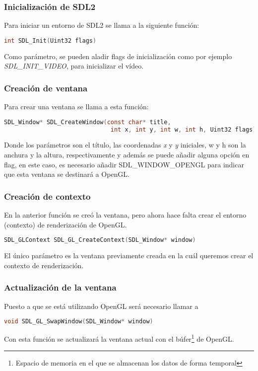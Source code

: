 \subsubsection{Inicialización de SDL2}
Para iniciar un entorno de SDL2 se llama a la siguiente función:
\begin{lstlisting}[language=C]
  int SDL_Init(Uint32 flags)
\end{lstlisting}
Como parámetro, se pueden aladir flags de inicialización como por ejemplo
\textit{SDL\_INIT\_VIDEO}, para inicializar el vídeo.

\subsubsection{Creación de ventana}
Para crear una ventana se llama a esta función:
\begin{lstlisting}[language=C]
  SDL_Window* SDL_CreateWindow(const char* title,
                              int x, int y, int w, int h, Uint32 flags)
\end{lstlisting}
Donde los parámetros son el título, las coordenadas \textit{x} y \textit{y} iniciales, w y h son la anchura y la altura, respectivamente y además se puede añadir alguna opción en flag, en este caso, es necesario añadir SDL\_WINDOW\_OPENGL para indicar que esta ventana se destinará a OpenGL.

\subsubsection{Creación de contexto}
En la anterior función se creó la ventana, pero ahora hace falta crear el entorno (contexto) de renderización de OpenGL.
\begin{lstlisting}[language=C]
  SDL_GLContext SDL_GL_CreateContext(SDL_Window* window)
\end{lstlisting}
El único parámetro es la ventana previamente creada en la cuál queremos crear el contexto de renderización.

\subsubsection{Actualización de la ventana}
Puesto a que se está utilizando OpenGL será necesario llamar a
\begin{lstlisting}[language=C]
  void SDL_GL_SwapWindow(SDL_Window* window)
\end{lstlisting}
Con esta función se actualizará la ventana actual con el búfer\footnote{Espacio de memoria en el que se almacenan los datos de forma temporal} de OpenGL.

